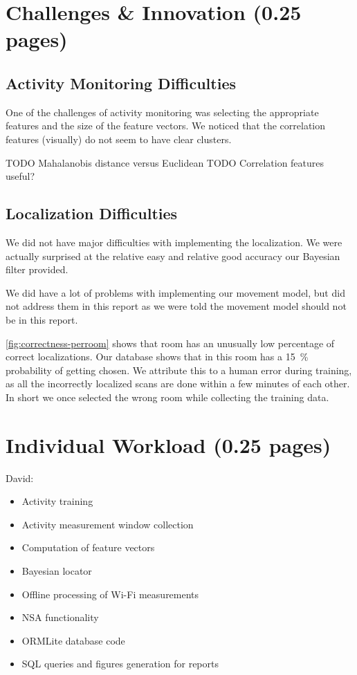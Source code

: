\documentclass[a4paper,10pt,twoside]{IEEEtran}
\begin{document}
\section{Challenges \& Innovation (0.25 pages)}
\label{sec:innovation}
\subsection{Activity Monitoring Difficulties}
One of the challenges of activity monitoring was selecting the appropriate features and the size of the feature vectors.
We noticed that the correlation features (visually) do not seem to have clear clusters.

TODO Mahalanobis distance versus Euclidean
TODO Correlation features useful?

\subsection{Localization Difficulties}

We did not have major difficulties with implementing the localization.
We were actually surprised at the relative easy and relative good accuracy our Bayesian filter provided.

We did have a lot of problems with implementing our movement model, but did not address them in this report as we were told the movement model should not be in this report.

\autoref{fig:correctness-perroom} shows that room  has an unusually low percentage of correct localizations. Our database shows that in this room  has a 15~\% probability of getting chosen.
We attribute this to a human error during training, as all the incorrectly localized scans are done within a few minutes of each other.
In short we once selected the wrong room while collecting the training data.

\section{Individual Workload (0.25 pages)}
\label{sec:individual-workload}
David:
\begin{itemize}
    \item Activity training
    \item Activity measurement window collection
    \item Computation of feature vectors
    \item Bayesian locator
    \item Offline processing of Wi-Fi measurements
    \item NSA functionality
    \item ORMLite database code
    \item SQL queries and figures generation for reports
\end{itemize}
\end{document}
